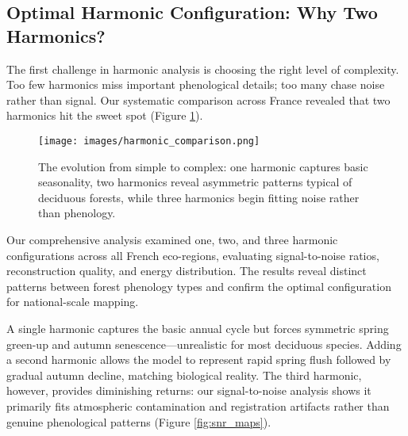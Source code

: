 \documentclass[utf8]{FrontiersinHarvard}
\begin{document}

\subsection{Optimal Harmonic Configuration: Why Two Harmonics?}

The first challenge in harmonic analysis is choosing the right level of complexity. Too few harmonics miss important phenological details; too many chase noise rather than signal. Our systematic comparison across France revealed that two harmonics hit the sweet spot (Figure \ref{fig:harmonic_cmp}).

\begin{figure}[H]
    \centering
    \texttt{[image: images/harmonic\_comparison.png]}
    \caption{The evolution from simple to complex: one harmonic captures basic seasonality, two harmonics reveal asymmetric patterns typical of deciduous forests, while three harmonics begin fitting noise rather than phenology.}
    \label{fig:harmonic_cmp}
\end{figure}

Our comprehensive analysis examined one, two, and three harmonic configurations across all French eco-regions, evaluating signal-to-noise ratios, reconstruction quality, and energy distribution. The results reveal distinct patterns between forest phenology types and confirm the optimal configuration for national-scale mapping.

A single harmonic captures the basic annual cycle but forces symmetric spring green-up and autumn senescence—unrealistic for most deciduous species. Adding a second harmonic allows the model to represent rapid spring flush followed by gradual autumn decline, matching biological reality. The third harmonic, however, provides diminishing returns: our signal-to-noise analysis shows it primarily fits atmospheric contamination and registration artifacts rather than genuine phenological patterns (Figure \ref{fig:snr_maps}).
\end{document}
